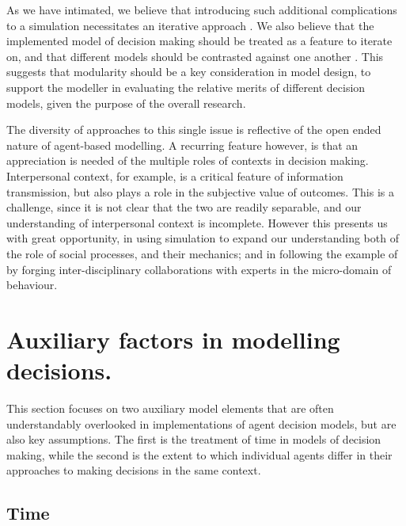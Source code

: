 \documentclass{article}
\begin{document}
As we have intimated, we believe that introducing such additional complications to a simulation necessitates an iterative approach \citep{Cioffi-Revilla2010}. We also believe that the implemented model of decision making should be treated as a feature to iterate on, and that different models should be contrasted against one another \citep{Rossiter2014}. This suggests that modularity should be a key consideration in model design, to support the modeller in evaluating the relative merits of different decision models, given the purpose of the overall research.

The diversity of approaches to this single issue is reflective of the open ended nature of agent-based modelling. A recurring feature however, is that an appreciation is needed of the multiple roles of contexts in decision making. Interpersonal context, for example, is a critical feature of information transmission, but also plays a role in the subjective value of outcomes. This is a challenge, since it is not clear that the two are readily separable, and our understanding of interpersonal context is incomplete.
However this presents us with great opportunity, in using simulation to expand our understanding both of the role of social processes, and their mechanics; and in following the example of \citeauthor{Tversky1992} by forging inter-disciplinary collaborations with experts in the micro-domain of behaviour.




\section{Auxiliary factors in modelling
decisions.}\label{auxiliary-factors-in-modelling-decisions}

This section focuses on two auxiliary model elements that are often understandably overlooked in implementations of agent decision models, but are also key assumptions. The first is the treatment of time in models of decision making, while the second is the extent to which individual agents differ in their approaches to making decisions in the same context.

\subsection{Time}\label{time}
\end{document}
